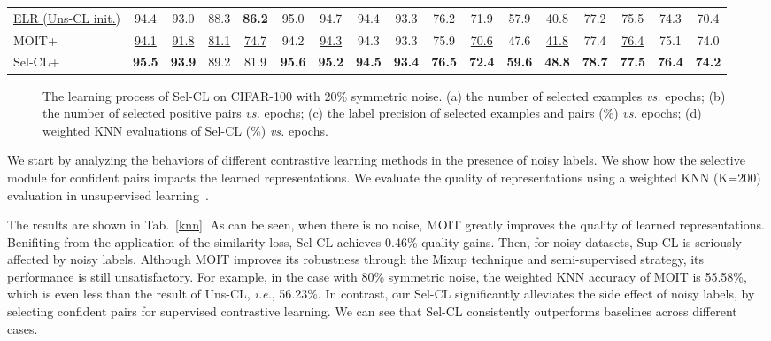 \documentclass[10pt,twocolumn,letterpaper]{article}
\begin{document}
\begin{table*}[h]
\begin{tabular}{l|cccc|cccc|cccc|cccc}
		\underline{ELR (Uns-CL init.)} & 94.4 & 93.0 & 88.3 & \textbf{86.2} &  {95.0} & {94.7} & {94.4} &  {93.3} & {76.2} & 71.9 & {57.9} & 40.8 & 77.2 & 75.5 & 74.3 & 70.4\\
		MOIT+~\cite{Ortego2021} & \underline{94.1} & \underline{91.8} & \underline{81.1} & \underline{74.7} & 94.2 & \underline{94.3} & 94.3 & 93.3 & {75.9} & \underline{70.6} & {47.6} & \underline{41.8} & 77.4 & \underline{76.4} & 75.1 & 74.0 \\
		\hline			
		Sel-CL+ & \textbf{95.5} & \textbf{93.9} & 89.2 & 81.9 &  \textbf{95.6} &  \textbf{95.2} & \textbf{94.5}  & \textbf{93.4} & \textbf{76.5} & \textbf{72.4} & \textbf{59.6} & \textbf{48.8} & \textbf{78.7} &  \textbf{77.5} & \textbf{76.4}  & \textbf{74.2} \\
		\hline
	\end{tabular}
	\label{cifar10}
\end{table*}

\begin{figure}[h]
	\centering
	\vspace{6pt}
	
	\caption{The learning process of Sel-CL on CIFAR-100 with 20\% symmetric noise. (a) the number of selected examples \textit{vs.} epochs; (b) the number of selected positive pairs \textit{vs.} epochs; (c) the label precision of selected examples and pairs (\%) \textit{vs.} epochs; (d) weighted KNN evaluations of Sel-CL (\%) \textit{vs.} epochs. }
	\label{learning_process}
	\vspace{-5pt}
\end{figure}


We start by analyzing the behaviors of different contrastive learning methods in the presence of noisy labels. We show how the selective module for confident pairs impacts the learned representations. We evaluate the quality of representations using a weighted KNN (K=200) evaluation in unsupervised learning~\cite{HuangDGZ19}. 

The results are shown in Tab.~\ref{knn}. As can be seen, when there is no noise, MOIT greatly improves the quality of learned representations. Benifiting from the application of the similarity loss, Sel-CL achieves 0.46\% quality gains. Then, for noisy datasets, Sup-CL is seriously affected by noisy labels. Although MOIT improves its robustness through the Mixup technique and semi-supervised strategy, its performance is still unsatisfactory. For example, in the case with 80\% symmetric noise, the weighted KNN accuracy of MOIT is 55.58\%, which is even less than the result of Uns-CL, \textit{i.e.}, 56.23\%. In contrast, our Sel-CL significantly alleviates the side effect of noisy labels, by selecting confident pairs for supervised contrastive learning. We can see that Sel-CL consistently outperforms baselines across different cases. 
\end{document}
